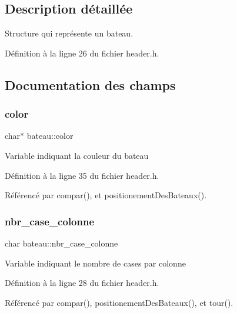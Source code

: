 \subsection{Description détaillée}
Structure qui représente un bateau. 

Définition à la ligne 26 du fichier header.\+h.



\subsection{Documentation des champs}
\mbox{\label{structbateau_a41910d4781ab6f3256d23f62b98c49a1}} 
\subsubsection{\texorpdfstring{color}{color}}
{\footnotesize\ttfamily char$\ast$ bateau\+::color}

Variable indiquant la couleur du bateau 

Définition à la ligne 35 du fichier header.\+h.



Référencé par compar(), et positionement\+Des\+Bateaux().

\mbox{\label{structbateau_a1a56dd379e7c5cfc5714fd204947a0a8}} 
\subsubsection{\texorpdfstring{nbr\+\_\+case\+\_\+colonne}{nbr\_case\_colonne}}
{\footnotesize\ttfamily char bateau\+::nbr\+\_\+case\+\_\+colonne}

Variable indiquant le nombre de cases par colonne 

Définition à la ligne 28 du fichier header.\+h.



Référencé par compar(), positionement\+Des\+Bateaux(), et tour().

\mbox{\label{structbateau_a5f7637b2932717e5589e1a368dd1b47b}} 
